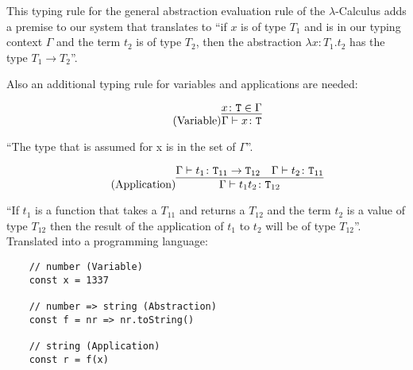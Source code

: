 This typing rule for the general abstraction evaluation rule
of the $\lambda$-Calculus  adds
a premise to our system that translates to ``if $x$ is of
type $T_1$ and is in our typing context $\Gamma$ and
the term $t_2$ is of type $T_2$, then the abstraction
$\lambda x \colon T_1 . t_2$ has the type $T_1 \rightarrow T_2$''.

Also an additional typing rule for variables and applications
are needed:

\begin{equation*}
    \tag{Variable}
    \infer{
        \Gamma \vdash x \colon \texttt{T}
    }{
        x \colon \texttt{T} \in \Gamma
    }
\end{equation*}

``The type that is assumed for x is in the set of $\Gamma$''.

\begin{equation*}
    \tag{Application}
    \infer{
        \Gamma \vdash t_1 t_2 \colon \texttt{T}_{12}
    }{
        \Gamma \vdash t_1 \colon \texttt{T}_{11} \rightarrow \texttt{T}_{12}
        &
        \Gamma \vdash t_2 \colon \texttt{T}_{11}
    }
\end{equation*}

``If $t_1$ is a function that takes a $T_{11}$ and returns a
$T_{12}$ and the term $t_2$ is a value of type $T_{12}$ then
the result of the application of $t_1$ to $t_2$ will
be of type $T_{12}$''.
\\[12pt]
Translated into a programming language:

\begin{verbatim}
    // number (Variable)
    const x = 1337

    // number => string (Abstraction)
    const f = nr => nr.toString()

    // string (Application)
    const r = f(x)
\end{verbatim}
